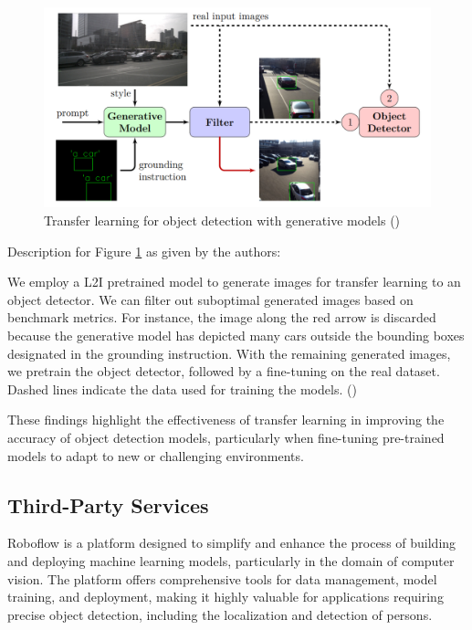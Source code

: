 \begin{figure}[H]
    \centering
    \includegraphics[width=\textwidth]{Images/Diagrams/generated_training_images.png}
    \caption[Transfer learning for object detection with generative models (\cite{TransferLearningGenerative2023})]{Transfer learning for object detection with generative models (\cite{TransferLearningGenerative2023})}
    \label{fig:training_data_generated}
\end{figure}

Description for Figure \ref{fig:training_data_generated} as given by the authors:

\begin{myquote}
    We employ a L2I pretrained model to generate images for transfer learning to an object detector. We can filter out suboptimal generated images based on benchmark metrics. For instance, the image along the red arrow is discarded because the generative model has depicted many cars outside the bounding boxes designated in the grounding instruction. With the remaining generated images, we pretrain the object detector, followed by a fine-tuning on the real dataset. Dashed lines indicate the data used for training the models. (\cite{TransferLearningGenerative2023})
\end{myquote}

These findings highlight the effectiveness of transfer learning in improving the accuracy of object detection models, particularly when fine-tuning pre-trained models to adapt to new or challenging environments.

\subsection{Third-Party Services}
\label{sec:thirdparty}
Roboflow is a platform designed to simplify and enhance the process of building and deploying machine learning models, particularly in the domain of computer vision. The platform offers comprehensive tools for data management, model training, and deployment, making it highly valuable for applications requiring precise object detection, including the localization and detection of persons.

